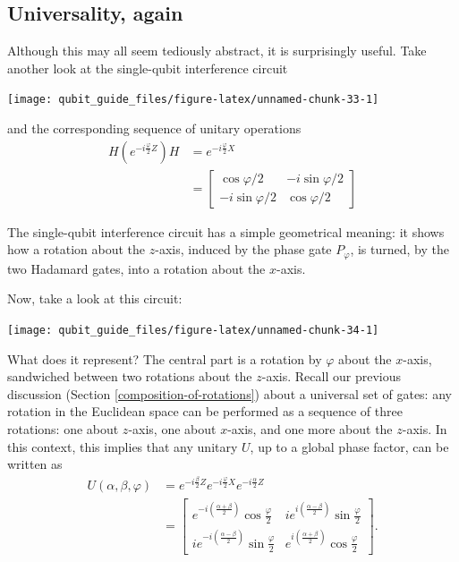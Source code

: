 \documentclass[fleqn,a4paper]{article}
\newenvironment{idea}{\everypar{\setlength{\parindent}{1.5em}}}{}
\theoremstyle{definition}
\theoremstyle{definition}
\theoremstyle{definition}
\theoremstyle{definition}
\theoremstyle{remark}
\begin{document}
\hypertarget{universality-again}{%
\subsection{Universality, again}\label{universality-again}}

Although this may all seem tediously abstract, it is surprisingly useful.
Take another look at the single-qubit interference circuit

\begin{center}\texttt{[image: qubit\_guide\_files/figure-latex/unnamed-chunk-33-1]} \end{center}

and the corresponding sequence of unitary operations
\[
  \begin{aligned}
    H \left(
      e^{-i\frac{\varphi}{2}Z}
    \right) H
    &= e^{-i\frac{\varphi}{2}X}
  \\&= \begin{bmatrix}
      \cos\varphi/2 & -i\sin\varphi/2
    \\-i\sin\varphi/2 & \cos\varphi/2
    \end{bmatrix}
  \end{aligned}
\]

\begin{idea}
The single-qubit interference circuit has a simple geometrical meaning: it shows how a rotation about the \(z\)-axis, induced by the phase gate \(P_\varphi\), is turned, by the two Hadamard gates, into a rotation about the \(x\)-axis.

\end{idea}

Now, take a look at this circuit:

\begin{center}\texttt{[image: qubit\_guide\_files/figure-latex/unnamed-chunk-34-1]} \end{center}

What does it represent?
The central part is a rotation by \(\varphi\) about the \(x\)-axis, sandwiched between two rotations about the \(z\)-axis.
Recall our previous discussion (Section \ref{composition-of-rotations}) about a universal set of gates: any rotation in the Euclidean space can be performed as a sequence of three rotations: one about \(z\)-axis, one about \(x\)-axis, and one more about the \(z\)-axis.
In this context, this implies that any unitary \(U\), up to a global phase factor, can be written as
\[
  \begin{aligned}
    U(\alpha, \beta, \varphi)
    &= e^{-i\frac{\beta}{2}Z} e^{-i\frac{\varphi}{2}X} e^{-i\frac{\alpha}{2}Z}
  \\&= \begin{bmatrix}
      e^{-i\left(\frac{\alpha+\beta}{2}\right)}\cos\frac{\varphi}{2}
      & ie^{i\left(\frac{\alpha-\beta}{2}\right)}\sin\frac\varphi{2}
    \\ie^{-i\left(\frac{\alpha-\beta}{2}\right)}\sin\frac\varphi{2}
      & e^{i\left(\frac{\alpha+\beta}{2}\right)}\cos\frac\varphi{2}
    \end{bmatrix}.
  \end{aligned}
\]
\end{document}
